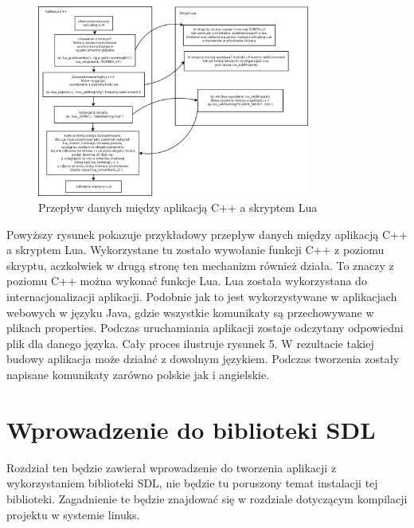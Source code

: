 \begin{figure}[h]
    \centering
    \includegraphics[width=0.8\textwidth,natwidth=410,natheight=142]{./Pictures/lua_skrypty.png}
    \caption{Przepływ danych między aplikacją C++ a skryptem Lua}
\end{figure}

Powyższy rysunek pokazuje przykładowy przepływ danych między aplikacją C++ a skryptem Lua. Wykorzystane tu zostało wywołanie funkcji C++ z poziomu skryptu, aczkolwiek w drugą stronę ten mechanizm również działa. To znaczy z poziomu C++ można wykonać funkcje Lua. Lua została wykorzystana do internacjonalizacji aplikacji. Podobnie jak to jest wykorzystywane w aplikacjach webowych w języku Java, gdzie wszystkie komunikaty są przechowywane w plikach properties. Podczas uruchamiania aplikacji zostaje odczytany odpowiedni plik dla danego języka. Cały proces ilustruje rysunek 5. W rezultacie takiej budowy aplikacja może działać z dowolnym językiem. Podczas tworzenia zostały napisane komunikaty zarówno polskie jak i angielskie.


\section{Wprowadzenie do biblioteki SDL}
Rozdział ten będzie zawierał wprowadzenie do tworzenia aplikacji z wykorzystaniem biblioteki SDL, nie będzie tu poruszony temat instalacji tej biblioteki. Zagadnienie te będzie znajdować się w rozdziale dotyczącym kompilacji projektu w systemie linuks. 

